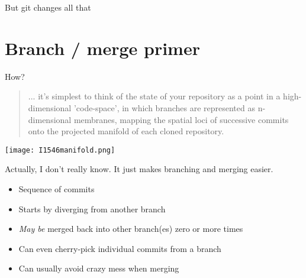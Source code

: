 \documentclass{beamer}
\begin{document}
\begin{frame}[plain]

But git changes all that

\end{frame}

\section{Branch / merge primer}

\begin{frame}

How?


\begin{small}
  
\begin{quote}
... it's simplest to think of the state of your repository as a point
in a high-dimensional 'code-space', in which branches are represented
as n-dimensional membranes, mapping the spatial loci of successive
commits onto the projected manifold of each cloned repository.
\end{quote}
\end{small}
\begin{center}

      \texttt{[image: I1546manifold.png]}      
  
\end{center}
\end{frame}

\begin{frame}[plain]
Actually, I don't really know.
It just makes branching and merging easier.
\end{frame}

\begin{frame}[plain]

\begin{Large}
\begin{itemize}

\item Sequence of commits
\item Starts by diverging from another branch
\item {\it May be} merged back into other branch(es) zero or more times
\item Can even cherry-pick individual commits from a branch
\item Can usually avoid crazy mess when merging
\end{itemize}
\end{Large}
\end{frame}
\end{document}
